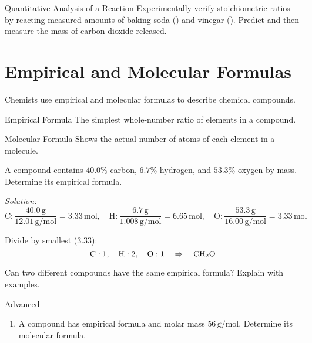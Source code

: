 \begin{investigation}{Quantitative Analysis of a Reaction}
Experimentally verify stoichiometric ratios by reacting measured amounts of baking soda () and vinegar (). Predict and then measure the mass of carbon dioxide released.
\end{investigation}

\FloatBarrier

\section{Empirical and Molecular Formulas}
\FloatBarrier
\FloatBarrier
\FloatBarrier

Chemists use empirical and molecular formulas to describe chemical compounds.

\begin{keyconcept}{Empirical Formula}
The simplest whole-number ratio of elements in a compound.
\end{keyconcept}

\begin{keyconcept}{Molecular Formula}
Shows the actual number of atoms of each element in a molecule.
\end{keyconcept}

\begin{example}
A compound contains \(40.0\%\) carbon, \(6.7\%\) hydrogen, and \(53.3\%\) oxygen by mass. Determine its empirical formula.

\textit{Solution:}
\[
\text{C}: \frac{40.0\,\si{\gram}}{12.01\,\si{\gram\per\mol}}=3.33\,\si{\mol},\quad
\text{H}: \frac{6.7\,\si{\gram}}{1.008\,\si{\gram\per\mol}}=6.65\,\si{\mol},\quad
\text{O}: \frac{53.3\,\si{\gram}}{16.00\,\si{\gram\per\mol}}=3.33\,\si{\mol}
\]

Divide by smallest (3.33):
\[
\text{C}:1,\quad\text{H}:2,\quad\text{O}:1\quad\Rightarrow\quad\ce{CH2O}
\]
\end{example}

\begin{stopandthink}
Can two different compounds have the same empirical formula? Explain with examples.
\end{stopandthink}

\begin{tieredquestions}{Advanced}
\begin{enumerate}
  \item A compound has empirical formula  and molar mass \(56\,\si{\gram\per\mol}\). Determine its molecular formula.
\end{enumerate}
\end{tieredquestions}

